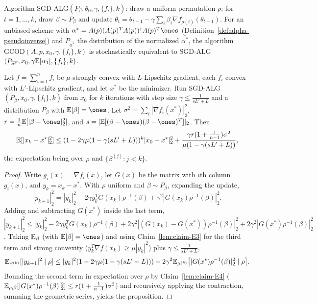 \begin{definition}
  \label{alg:sgd-alg}
  Algorithm SGD-ALG$(P_\beta, \theta_0, \gamma, \{f_i\}, k)$: draw a uniform
  permutation $\rho$; for $t = 1,\dots,k$, draw $\beta \sim P_\beta$ and update
  $\theta_t = \theta_{t-1} - \gamma\sum_i \beta_i \nabla f_{\rho(i)}(\theta_{t-1})$.
  For an unbiased scheme with $\alpha^* = A(p)(A(p)^TA(p))^{\dagger}A(p)^T\ones$
  (Definition~\ref{def:alpha-pseudoinverse}) and $P_{\overline{\alpha^*}}$ the
  distribution of the normalized $\overline{\alpha^*}$, the algorithm
  GCOD$(A,p,x_0,\gamma,\{f_i\},k)$ is stochastically equivalent to
  SGD-ALG$(P_{\overline{\alpha^*}}, x_0, \gamma\mathbb{E}[\alpha_1], \{f_i\}, k)$.
\end{definition}

\begin{proposition}
  \label{prop:convergence-random}
  Let $f = \sum_{i=1}^n f_i$ be $\mu$-strongly convex with $L$-Lipschitz
  gradient, each $f_i$ convex with $L'$-Lipschitz gradient, and let $x^*$ be the
  minimizer. Run SGD-ALG$(P_\beta, x_0, \gamma, \{f_i\}, k)$ from $x_0$ for $k$
  iterations with step size $\gamma \le \tfrac{1}{sL'+L}$ and a distribution
  $P_\beta$ with $\E[\beta] = \ones$. Let
  $\sigma^2 = \sum_i|\nabla f_i(x^*)|_2^2$,
  $r = \tfrac1n\E[|\beta - \ones|_2^2]$, and
  $s = |\E[(\beta - \ones)(\beta - \ones)^T]|_2$. Then
  \[
    \mathbb{E}[|x_k - x^*|_2^2]
      \le (1 - 2\gamma\mu(1 - \gamma(sL'+L)))^k |x_0 - x^*|_2^2
        + \frac{\gamma r(1 + \tfrac1{n-1})\sigma^2}{\mu(1 - \gamma(sL'+L))},
  \]
  the expectation being over $\rho$ and $\{\beta^{(j)} : j < k\}$.
\end{proposition}
\begin{proof}
  Write $g_i(x) = \nabla f_i(x)$, let $G(x)$ be the matrix with $i$th column
  $g_i(x)$, and $y_k = x_k - x^*$. With $\rho$ uniform and $\beta \sim P_\beta$,
  expanding the update,
  \[
    |y_{k+1}|_2^2 = |y_k|_2^2 - 2\gamma y_k^T G(x_k)\rho^{-1}(\beta)
      + \gamma^2|G(x_k)\rho^{-1}(\beta)|_2^2 .
  \]
  Adding and subtracting $G(x^*)$ inside the last term,
  $|y_{k+1}|_2^2 \le |y_k|_2^2 - 2\gamma y_k^T G(x_k)\rho^{-1}(\beta)
   + 2\gamma^2|(G(x_k) - G(x^*))\rho^{-1}(\beta)|_2^2
   + 2\gamma^2|G(x^*)\rho^{-1}(\beta)|_2^2$.
  Taking $\mathbb{E}_\beta$ (with $\E[\beta] = \ones$) and using
  Claim~\ref{lem:claim-E3} for the third term and strong convexity
  ($y_k^T\nabla f(x_k) \ge \mu|y_k|^2$) plus $\gamma \le \tfrac1{sL'+L}$,
  \[
    \mathbb{E}_{\beta^{(k)}}[|y_{k+1}|^2 \mid \rho]
      \le |y_k|^2(1 - 2\gamma\mu(1 - \gamma(sL'+L)))
        + 2\gamma^2\mathbb{E}_{\beta^{(k)}}\big[|G(x^*)\rho^{-1}(\beta)|_2^2 \mid \rho\big].
  \]
  Bounding the second term in expectation over $\rho$ by
  Claim~\ref{lem:claim-E4} ($\mathbb{E}_{\rho,\beta}[|G(x^*)\rho^{-1}(\beta)|_2^2]
  \le r(1+\tfrac1{n-1})\sigma^2$) and recursively applying the contraction,
  summing the geometric series, yields the proposition.
\end{proof}

